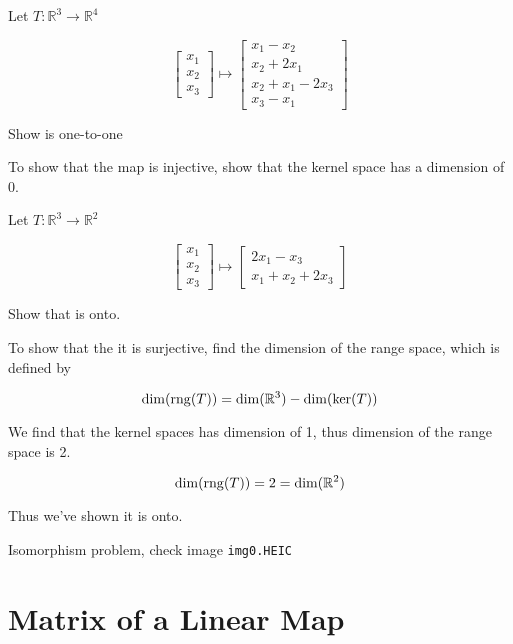 \begin{example}
	Let $T: \mathbb{R}^3 \to \mathbb{R}^4$

	\[\begin{bmatrix}
		x_1\\x_2\\x_3
	\end{bmatrix} \mapsto \begin{bmatrix}
		x_1 - x_2\\x_2 + 2x_1\\x_2+x_1-2x_3\\x_3 - x_1
	\end{bmatrix}\]

	Show is one-to-one
\end{example}

\begin{sol}
	To show that the map is injective, show that the kernel space has a dimension of 0.
\end{sol}


\begin{example}
	Let $T:\mathbb{R}^3 \to \mathbb{R}^2$

	\[\begin{bmatrix}
		x_1\\x_2\\x_3
	\end{bmatrix} \mapsto \begin{bmatrix}
		2x_1 - x_3\\x_1+x_2+2x_3
	\end{bmatrix}\]

	Show that is onto.
\end{example}

\begin{sol}
	To show that the it is surjective, find the dimension of the range space, which is defined by

	\[\dim(\mathrm{rng}(T)) = \dim(\mathbb{R}^3) - \dim(\ker(T))\]

	We find that the kernel spaces has dimension of 1, thus dimension of the range space is 2.

	\[\dim(\mathrm{rng}(T)) = 2 = \dim(\mathbb{R}^2)\]

	Thus we've shown it is onto.
\end{sol}

\begin{example}
	Isomorphism problem, check image \verb|img0.HEIC|
\end{example}

\section{Matrix of a Linear Map}

